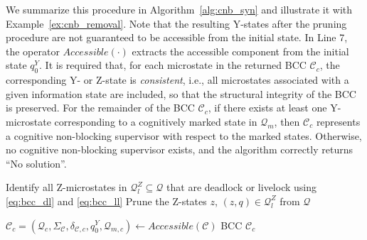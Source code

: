 \documentclass[journal,twoside,web]{ieeecolor}
\begin{document}
We summarize this procedure in Algorithm~\ref{alg:cnb_syn} and illustrate it with Example~\ref{ex:cnb_removal}.
%
Note that the resulting Y-states after the pruning procedure are not guaranteed to be accessible from the initial state. 
In Line 7, the operator $Accessible(\cdot)$ extracts the accessible component from the initial state $q^Y_0$.
%
%
It is required that, for each microstate in the returned BCC $\mathcal{C}_c$, the corresponding Y- or Z-state is \emph{consistent}, i.e., all microstates associated with a given information state are included, so that the structural integrity of the BCC is preserved.  
%
For the remainder of the BCC $\mathcal{C}_c$, if there exists at least one Y-microstate corresponding to a cognitively marked state in $\bm{\mathcal{Q}}_{m}$, then $\mathcal{C}_c$ represents a cognitive non-blocking supervisor with respect to the marked states.
Otherwise, no cognitive non-blocking supervisor exists, and the algorithm correctly returns ``No solution''.
%

\begin{algorithm}[t!]
\caption{Synthesis of Cognitive Non-Blocking BCC}
\label{alg:cnb_syn}

\BlankLine

Identify all Z-microstates in $\bm{\mathcal{Q}}^Z_l \subseteq \bm{\mathcal{Q}}$ that are deadlock or livelock using \eqref{eq:bcc_dl} and \eqref{eq:bcc_ll}\;
Prune the Z-states $z$, $(z, q) \in \bm{\mathcal{Q}}^Z_l$ from $\bm{\mathcal{Q}}$\;

$\mathcal{C}_c = (\bm{\mathcal{Q}}_c, \Sigma_\mathcal{C}, \delta_{\mathcal{C}, c}, q^Y_0, \bm{\mathcal{Q}}_{m,c}) \gets Accessible(\mathcal{C})$\;
\Return BCC $\mathcal{C}_c$\;
\end{algorithm}
\end{document}
